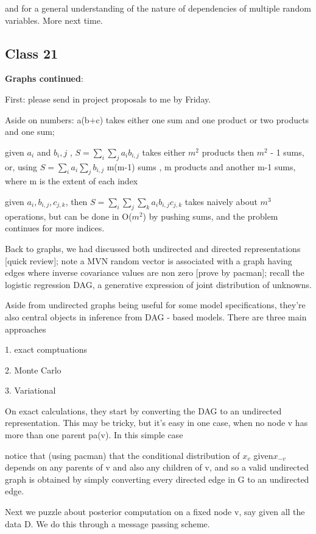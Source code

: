 \documentclass[11pt,a4paper]{article}
\begin{document}
	and for a general understanding of the nature of dependencies of multiple random variables. More next time.
	
\subsection*{Class 21}
\textbf{ Graphs continued}:
	
	First: please send in project proposals to me by Friday.
	
	Aside on numbers:  a(b+c) takes either one sum and one product or two products and one sum; 
	
	given ${a_i}$ and ${b_i,j} $ ,  $S = \sum_i \sum_j  a_i b_{i,j} $  takes either $m^2$ products then $m^2$ - 1 sums, or, using $S= \sum_i a_i \sum_j b_{i,j} $  m(m-1) sums , m products and another m-1 sums, where m is the extent of each index
	
	given ${a_i}, {b_{i,j}}, {c_{j,k}}$,   then $S = \sum_i \sum_j \sum_k a_i b_{i,j} c_{j,k}  $ takes naively about $m^3$ operations, but can be done in O($m^2$) by pushing sums,  and the problem continues for more indices.
	
	
	
	Back to graphs, we had discussed both undirected and directed representations [quick review];   note a MVN random vector is associated with a graph having edges where inverse covariance values are non zero [prove by pacman];  recall the logistic regression DAG, a generative expression of joint distribution of unknowns.
	
	Aside from undirected graphs being useful for some model specifications, they're also central objects in inference from DAG - based models.  There are three main approaches
	
	1. exact comptuations
	
	2. Monte Carlo
	
	3. Variational
	
	On exact calculations, they start by converting the DAG to an undirected representation.   This may be tricky, but it's easy in one case, when no node v has more than one parent pa(v).  In this simple case
	
	notice that (using pacman) that the conditional distribution of $x_v$ given$ x_{-v}$ depends on any parents of v and also any children of v, and so a valid undirected graph is obtained by simply converting every directed edge in G to an undirected edge.
	
	Next we puzzle about posterior computation on a fixed node v, say given all the data D.  We do this through a message passing scheme.
	
\end{document}
